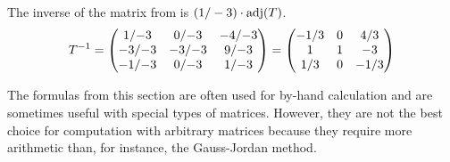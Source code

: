 \begin{example}
The inverse of the matrix from 
is $(1/-3)\cdot\operatorname{adj}(T)$.
\begin{equation*}
  T^{-1}
  =\begin{pmatrix}  %
     1/\hbox{$-3$}  &0/\hbox{$-3$}  &-4/\hbox{$-3$}  \\
    -3/\hbox{$-3$}  &-3/\hbox{$-3$} &9/\hbox{$-3$}   \\
    -1/\hbox{$-3$}  &0/\hbox{$-3$}  &1/\hbox{$-3$}
   \end{pmatrix}
  =\begin{pmatrix}
     -1/3  &0  &4/3  \\
      1    &1  &-3   \\
      1/3  &0  &-1/3
   \end{pmatrix}
\end{equation*}
\end{example}

The formulas from this section are often used for by-hand
calculation and are sometimes useful with special types of matrices.
However, they are
not the best choice for computation with arbitrary matrices
because they require more arithmetic than, for instance, the 
Gauss-Jordan method.




